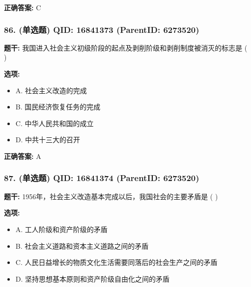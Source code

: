 \documentclass[12pt,UTF8]{ctexart}
\begin{document}
\textbf{正确答案:}
C

\vspace{0.3em}\hrulefill\vspace{0.7em}

\subsubsection*{86. (单选题) \small QID: 16841373 (ParentID: 6273520)}

\textbf{题干:}
我国进入社会主义初级阶段的起点及剥削阶级和剥削制度被消灭的标志是 ( )



\textbf{选项:}
\begin{itemize}[leftmargin=*]

  \item A. 社会主义改造的完成

  \item B. 国民经济恢复任务的完成

  \item C. 中华人民共和国的成立

  \item D. 中共十三大的召开

\end{itemize}

\textbf{正确答案:}
A

\vspace{0.3em}\hrulefill\vspace{0.7em}

\subsubsection*{87. (单选题) \small QID: 16841374 (ParentID: 6273520)}

\textbf{题干:}
1956年，社会主义改造基本完成以后，我国社会的主要矛盾是 ( )



\textbf{选项:}
\begin{itemize}[leftmargin=*]

  \item A. 工人阶级和资产阶级的矛盾

  \item B. 社会主义道路和资本主义道路之间的矛盾

  \item C. 人民日益增长的物质文化生活需要同落后的社会生产之间的矛盾

  \item D. 坚持思想基本原则和资产阶级自由化之间的矛盾

\end{itemize}
\end{document}

